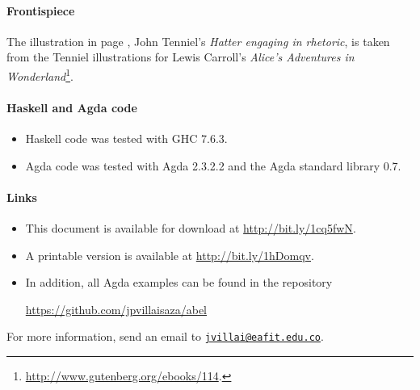 \paragraph{Frontispiece}

The illustration in page \pageref{fig:hatter}, John Tenniel's
\emph{Hatter engaging in rhetoric}, is taken from the Tenniel
illustrations for Lewis Carroll's \emph{Alice's Adventures in
  Wonderland}\footnote{\url{http://www.gutenberg.org/ebooks/114}.}.

\paragraph{Haskell and Agda code}

\begin{itemize}
\item
  Haskell code was tested with GHC 7.6.3.

\item
  Agda code was tested with Agda 2.3.2.2 and the Agda standard library
  0.7.

\end{itemize}

\paragraph{Links}

\begin{itemize}
\item
  This document is available for download at
  \url{http://bit.ly/1cq5fwN}.

\item
  A printable version is available at \url{http://bit.ly/1hDomqv}.

\item
  In addition, all Agda examples can be found in the repository
  \begin{center}
    \url{https://github.com/jpvillaisaza/abel}
  \end{center}

\end{itemize}
For more information, send an email to
\href{mailto:jvillai@eafit.edu.co}{\nolinkurl{jvillai@eafit.edu.co}}.

\clearemptydoublepage
